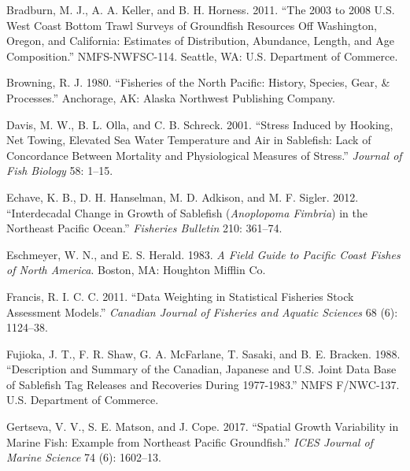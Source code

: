 \documentclass[11pt,
  english,
  a4paper,
]{article}
\newlength{\cslhangindent}
\newenvironment{cslreferences}%
  {\setlength{\parindent}{0pt}%
  \everypar{\setlength{\hangindent}{\cslhangindent}}\ignorespaces}%
  {\par}
\begin{document}
\leavevmode\tagmcend\tagstructend


\hypertarget{refs}{}
\begin{cslreferences}
\leavevmode\hypertarget{ref-bradburn_2003_2011}{}%
Bradburn, M. J., A. A. Keller, and B. H. Horness. 2011. ``The 2003 to 2008 U.S. West Coast Bottom Trawl Surveys of Groundfish Resources Off Washington, Oregon, and California: Estimates of Distribution, Abundance, Length, and Age Composition.'' NMFS-NWFSC-114. Seattle, WA: U.S. Department of Commerce.

\leavevmode\hypertarget{ref-browning1980}{}%
Browning, R. J. 1980. ``Fisheries of the North Pacific: History, Species, Gear, \& Processes.'' Anchorage, AK: Alaska Northwest Publishing Company.

\leavevmode\hypertarget{ref-davis2001}{}%
Davis, M. W., B. L. Olla, and C. B. Schreck. 2001. ``Stress Induced by Hooking, Net Towing, Elevated Sea Water Temperature and Air in Sablefish: Lack of Concordance Between Mortality and Physiological Measures of Stress.'' \emph{Journal of Fish Biology} 58: 1--15.

\leavevmode\hypertarget{ref-echave2012fishbullinterdecadal}{}%
Echave, K. B., D. H. Hanselman, M. D. Adkison, and M. F. Sigler. 2012. ``Interdecadal Change in Growth of Sablefish (\emph{Anoplopoma Fimbria}) in the Northeast Pacific Ocean.'' \emph{Fisheries Bulletin} 210: 361--74.

\leavevmode\hypertarget{ref-eschmeyer1983}{}%
Eschmeyer, W. N., and E. S. Herald. 1983. \emph{A Field Guide to Pacific Coast Fishes of North America}. Boston, MA: Houghton Mifflin Co.

\leavevmode\hypertarget{ref-Francis2011}{}%
Francis, R. I. C. C. 2011. ``Data Weighting in Statistical Fisheries Stock Assessment Models.'' \emph{Canadian Journal of Fisheries and Aquatic Sciences} 68 (6): 1124--38.

\leavevmode\hypertarget{ref-fujioka1988docdescription}{}%
Fujioka, J. T., F. R. Shaw, G. A. McFarlane, T. Sasaki, and B. E. Bracken. 1988. ``Description and Summary of the Canadian, Japanese and U.S. Joint Data Base of Sablefish Tag Releases and Recoveries During 1977-1983.'' NMFS F/NWC-137. U.S. Department of Commerce.

\leavevmode\hypertarget{ref-gertseva2017icesjmsspatial}{}%
Gertseva, V. V., S. E. Matson, and J. Cope. 2017. ``Spatial Growth Variability in Marine Fish: Example from Northeast Pacific Groundfish.'' \emph{ICES Journal of Marine Science} 74 (6): 1602--13.


\end{cslreferences}
\end{document}
